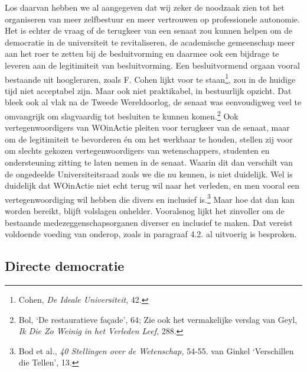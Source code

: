 \documentclass[smallauthor, chapterhaspagenum, nochapterinheader, pagenuminheader,  bigchapnum,medium2, tocpages, garamond, titleinheader]{jote-book}
\begin{document}
	Los daarvan hebben we al aangegeven dat wij zeker de noodzaak zien tot het organiseren van meer zelfbestuur en meer vertrouwen op professionele autonomie. Het is echter de vraag of de terugkeer van een senaat zou kunnen helpen om de democratie in de universiteit te revitaliseren, de academische gemeenschap meer aan het roer te zetten bij de besluitvorming en daarmee ook een bijdrage te leveren aan de legitimiteit van besluitvorming. Een besluitvormend orgaan vooral bestaande uit hoogleraren, zoals F. Cohen lijkt voor te staan\footnote{Cohen, \emph{De Ideale Universiteit}, 42.}, zou in de huidige tijd niet acceptabel zijn. Maar ook niet praktikabel, in bestuurlijk opzicht. Dat bleek ook al vlak na de Tweede Wereldoorlog, de senaat was eenvoudigweg veel te omvangrijk om slagvaardig tot besluiten te kunnen komen.\footnote{Bol, ‘De restauratieve façade', 64; Zie ook het vermakelijke verslag van Geyl, \emph{Ik Die Zo Weinig}\emph{ in het Verleden Leef}, 288.} Ook vertegenwoordigers van WOinActie pleiten voor terugkeer van de senaat, maar om de legitimiteit te bevorderen én om het werkbaar te houden, stellen zij voor om slechts gekozen vertegenwoordigers van wetenschappers, studenten en ondersteuning zitting te laten nemen in de senaat. Waarin dit dan verschilt van de ongedeelde Universiteitsraad zoals we die nu kennen, is niet duidelijk. Wel is duidelijk dat WOinActie niet echt terug wil naar het verleden, en men vooral een vertegenwoordiging wil hebben die divers en inclusief is.\footnote{Bod et al., \emph{40 Stellingen over de Wetenschap}\emph{, }54-55. van Ginkel ‘Verschillen die Tellen', 13.} Maar hoe dat dan kan worden bereikt, blijft volslagen onhelder. Vooralsnog lijkt het zinvoller om de bestaande medezeggenschapsorganen diverser en inclusief te maken. Dat vereist voldoende voeding van onderop, zoals in paragraaf 4.2. al uitvoerig is besproken.



	\subsection{Directe democratie}
\end{document}
